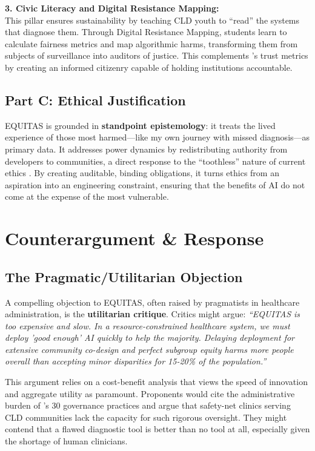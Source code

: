 \documentclass[12pt, letterpaper]{article}
\begin{document}
\textbf{3. Civic Literacy and Digital Resistance Mapping:} \\
This pillar ensures sustainability by teaching CLD youth to ``read'' the systems that diagnose them. Through Digital Resistance Mapping, students learn to calculate fairness metrics and map algorithmic harms, transforming them from subjects of surveillance into auditors of justice. This complements \cite{sagona2025}'s trust metrics by creating an informed citizenry capable of holding institutions accountable.

\subsection{Part C: Ethical Justification}
EQUITAS is grounded in \textbf{standpoint epistemology}: it treats the lived experience of those most harmed—like my own journey with missed diagnosis—as primary data. It addresses power dynamics by redistributing authority from developers to communities, a direct response to the ``toothless'' nature of current ethics \citep{munn2022}. By creating auditable, binding obligations, it turns ethics from an aspiration into an engineering constraint, ensuring that the benefits of AI do not come at the expense of the most vulnerable.

\section{Counterargument \& Response}

\subsection{The Pragmatic/Utilitarian Objection}
A compelling objection to EQUITAS, often raised by pragmatists in healthcare administration, is the \textbf{utilitarian critique}. Critics might argue: \textit{``EQUITAS is too expensive and slow. In a resource-constrained healthcare system, we must deploy 'good enough' AI quickly to help the majority. Delaying deployment for extensive community co-design and perfect subgroup equity harms more people overall than accepting minor disparities for 15-20\% of the population.''}

This argument relies on a cost-benefit analysis that views the speed of innovation and aggregate utility as paramount. Proponents would cite the administrative burden of \cite{lekadir2025}'s 30 governance practices and argue that safety-net clinics serving CLD communities lack the capacity for such rigorous oversight. They might contend that a flawed diagnostic tool is better than no tool at all, especially given the shortage of human clinicians.
\end{document}
